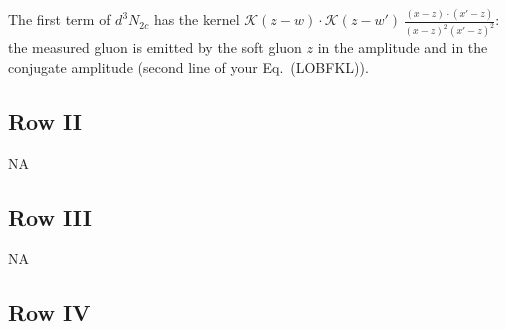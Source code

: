 \documentclass[9pt]{article}
\numberwithin{equation}{section}
\begin{document}
The first term of $d^3N_{2c}$ has the kernel $\mathcal K(z-w)\cdot\mathcal K(z-w')\,\frac{(x-z)\cdot(x'-z)}{(x-z)^2(x'-z)^2}$: the measured gluon is emitted by the soft gluon $z$ in the amplitude and in the conjugate amplitude (second line of your Eq.~(LOBFKL)).





\subsection{Row II}
\textsc{NA}
\subsection{Row III}
\textsc{NA}
\subsection{Row IV}
\end{document}
